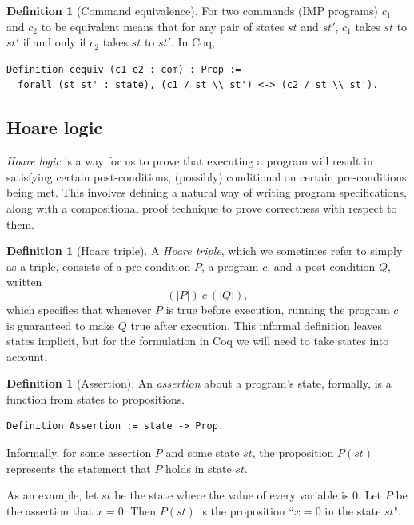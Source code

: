 \documentclass[12pt,notitlepage]{report}
\theoremstyle{plain}
\theoremstyle{definition}
\newtheorem{defin}[theo]{Definition}
\newcommand{\define}[1]{\emph{#1}\index{#1}}
\numberwithin{equation}{section}
\begin{document}
\begin{defin}[Command equivalence]\label{commequiv} 
    For two commands (IMP programs) $c_1$ and $c_2$ to be equivalent means that for any pair of states $st$ and $st'$, $c_1$ takes $st$ to $st'$ if and only if $c_2$ takes $st$ to $st'$.  In Coq,
\begin{verbatim}
Definition cequiv (c1 c2 : com) : Prop :=
  forall (st st' : state), (c1 / st \\ st') <-> (c2 / st \\ st').
\end{verbatim}
\end{defin}

\subsection{Hoare logic}
\define{Hoare logic} is a way for us to prove that executing a program will result in satisfying certain post-conditions, (possibly) conditional on certain pre-conditions being met.  This involves defining a natural way of writing program specifications, along with a compositional proof technique to prove correctness with respect to them.
\begin{defin}[Hoare triple]
	A \define{Hoare triple}, which we sometimes refer to simply as a triple, consists of a pre-condition $P$, a program $c$, and a post-condition $Q$, written
    \[
    	(| P |)\ c\ (| Q |),
    \]
    which specifies that whenever $P$ is true before execution, running the program $c$ is guaranteed to make $Q$ true after execution.  This informal definition leaves states implicit, but for the formulation in Coq we will need to take states into account.
\end{defin}

\begin{defin}[Assertion]
An \define{assertion} about a program's state, formally, is a function from states to propositions.
\begin{verbatim}Definition Assertion := state -> Prop.\end{verbatim}
Informally, for some assertion $P$ and some state $st$, the proposition $P(st)$ represents the statement that $P$ holds in state $st$.  
\par As an example, let $st$ be the state where the value of every variable is 0.  Let $P$ be the assertion that $x=0$.  Then $P(st)$ is the proposition ``$x = 0$ in the state $st$".
\end{defin}
\end{document}

